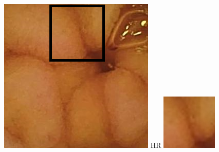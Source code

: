 \documentclass[conference]{IEEEtran}
\begin{document}
\begin{figure}[!t]
        \centering
        \includegraphics[width=\linewidth]{Figures/983/983_box.png}
        HR
    \endminipage\hfill
        \centering
        \includegraphics[width=\linewidth]{Figures/983/983_Bicubical.jpg}

\end{figure}
\end{document}
